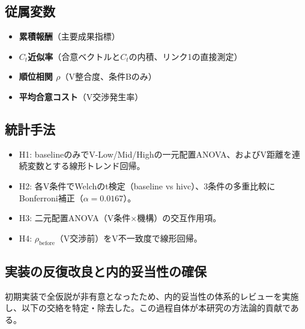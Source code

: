 \documentclass[11pt]{ltjsarticle}
\newcommand{\Ct}{\ensuremath{C_t}}
\begin{document}
\subsection{従属変数}

\begin{itemize}[nosep]
  \item \textbf{累積報酬}（主要成果指標）
  \item \textbf{\Ct{}近似率}（合意ベクトルと\Ct{}の内積、リンク1の直接測定）
  \item \textbf{順位相関 $\rho$}（V整合度、条件Bのみ）
  \item \textbf{平均合意コスト}（V交渉発生率）
\end{itemize}

\subsection{統計手法}

\begin{itemize}[nosep]
  \item H1: baselineのみでV-Low/Mid/Highの一元配置ANOVA、およびV距離を連続変数とする線形トレンド回帰。
  \item H2: 各V条件でWelchのt検定（baseline vs hivc）、3条件の多重比較にBonferroni補正（$\alpha=0.0167$）。
  \item H3: 二元配置ANOVA（V条件$\times$機構）の交互作用項。
  \item H4: $\rho_{\text{before}}$（V交渉前）をV不一致度で線形回帰。
\end{itemize}

\subsection{実装の反復改良と内的妥当性の確保}

初期実装で全仮説が非有意となったため、内的妥当性の体系的レビューを実施し、以下の交絡を特定・除去した。この過程自体が本研究の方法論的貢献である。
\end{document}
